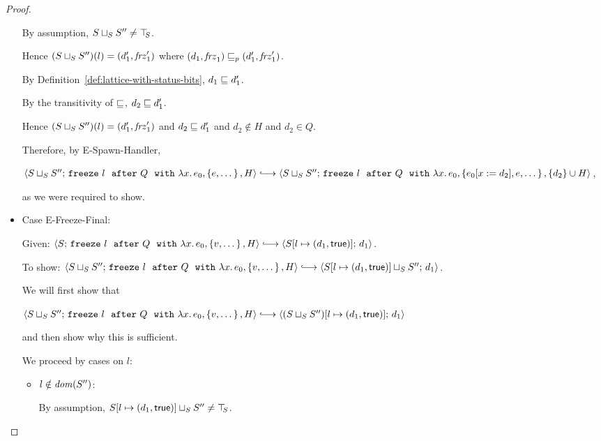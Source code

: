\begin{proof}
\begin{itemize}
      By assumption, $S \sqcup_{S} S'' \neq \top\hspace{-0.85mm}_{S}$.

      Hence $(S \sqcup_{S} S'')(l) = (d'_1, \mathit{frz}'_1)$ where
      $(d_1, \mathit{frz}_1) \sqsubseteq_p (d'_1, \mathit{frz}'_1)$.

      By Definition~\ref{def:lattice-with-status-bits}, $d_1 \sqsubseteq
      d'_1$.

      By the transitivity of $\sqsubseteq$, $d_2 \sqsubseteq d'_1$.

      Hence $(S \sqcup_{S} S'')(l) =
      (d'_1, \mathit{frz}'_1)$ and $d_2 \sqsubseteq d'_1$ and $d_2 \notin
      H$ and $d_2 \in Q$.

      Therefore, by {\sc E-Spawn-Handler},

      $\config{\lubstore{S}{S''}}{\freezeafterfull{l}{Q}{\lam{x}{e_0}}{\setof{e,
            \dots}}{H}} \parstepsto \\
      \config{\lubstore{S}{S''}}{\freezeafterfull{l}{Q}{\lam{x}{e_0}}{\setof{\subst{e_0}{x}{d_2},
            e, \dots}} {\{d_2\}\cup H}}$,

      as we were required to show.

    \item Case {\sc E-Freeze-Final}:


      Given:
      $\config{S}{\freezeafterfull{l}{Q}{\lam{x}{e_0}}{\setof{v,
            \dots}}{H}} \parstepsto
      \config{\extS{S}{l}{d_1}{\frozentrue}}{d_1}$.

      To show:
      $\config{\lubstore{S}{S''}}{\freezeafterfull{l}{Q}{\lam{x}{e_0}}{\setof{v,
            \dots}}{H}} \parstepsto
      \config{\lubstore{\extS{S}{l}{d_1}{\frozentrue}}{S''}}{d_1}$.

      We will first show that

      $\config{\lubstore{S}{S''}}{\freezeafterfull{l}{Q}{\lam{x}{e_0}}{\setof{v,
            \dots}}{H}} \parstepsto
      \config{\extS{(\lubstore{S}{S''})}{l}{d_1}{\frozentrue}}{d_1}$

      and then show why this is sufficient.

      We proceed by cases on $l$:
      \begin{itemize}
      \item $l \notin \mathit{dom}(S'')$:

        By assumption, $S[l \mapsto (d_1, \textsf{true})] \sqcup_{S} S''
        \neq \top\hspace{-0.85mm}_{S}$.


\end{itemize}
\end{itemize}
\end{proof}
